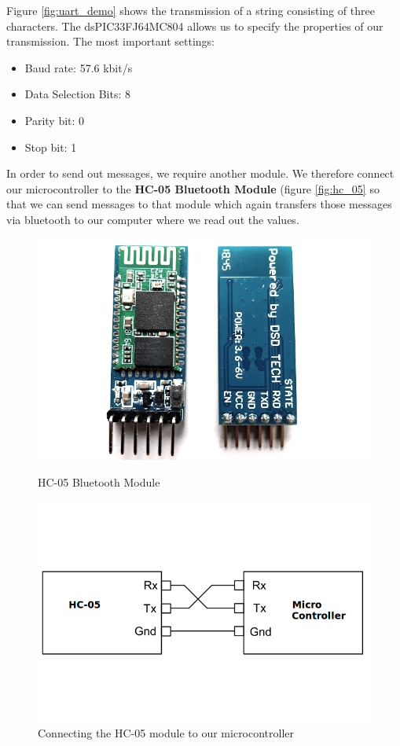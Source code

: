 \noindent
Figure \ref{fig:uart_demo} shows the transmission of a string consisting of three characters.
The dsPIC33FJ64MC804 allows us to specify the properties of our transmission. The most important settings:
\begin{itemize}
    \item Baud rate: 57.6 kbit/s
    \item Data Selection Bits: 8
    \item Parity bit: 0
    \item Stop bit: 1
\end{itemize}

\noindent
In order to send out messages, we require another module. We therefore connect our microcontroller to the \textbf{HC-05 Bluetooth Module} (figure \ref{fig:hc_05} so that we can send messages to that module which again transfers those messages via bluetooth to our computer where we read out the values.

\begin{figure}[htb]
    \centering
    \begin{minipage}{.5\textwidth}
          \centering
            \includegraphics[width=.9\linewidth]{figures/software/uart_hc05.jpg}
              \caption{HC-05 Bluetooth Module}
                \label{fig:hc_05}
    \end{minipage}%
    \begin{minipage}{.5\textwidth}
          \centering
            \includegraphics[width=.9\linewidth]{figures/software/uart_plug.png}
              \caption{Connecting the HC-05 module to our microcontroller}
                \label{fig:wire_3}
    \end{minipage}
\end{figure}

